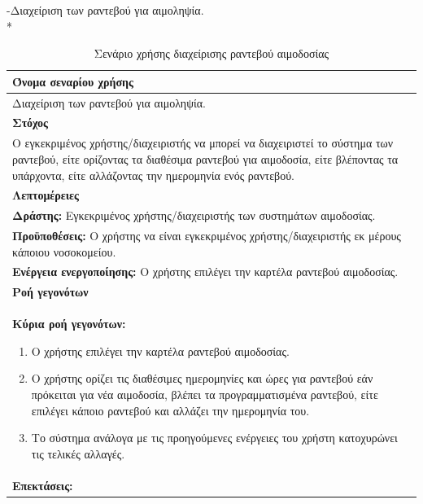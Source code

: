 \newpage
-Διαχείριση των ραντεβού για αιμοληψία.
\\*
\begin{table}[H]
	\begin{center}
	    \begin{tabular}{|p{\dimexpr \linewidth-2\tabcolsep}|}
	    \hline
	    \rowcolor{grayy}
	    \textbf{Όνομα σεναρίου χρήσης}
	    \\ \hline    
	     Διαχείριση των ραντεβού για αιμοληψία.
	     \\ \hline
	    \rowcolor{grayy}
	    \textbf{\textbf{Στόχος}}
	    \\ \hline
	 	 Ο εγκεκριμένος χρήστης/διαχειριστής να μπορεί να διαχειριστεί το σύστημα των ραντεβού, είτε ορίζοντας τα διαθέσιμα ραντεβού για αιμοδοσία, είτε βλέποντας τα υπάρχοντα, είτε αλλάζοντας την ημερομηνία ενός ραντεβού.
	    \\ \hline
	    \rowcolor{grayy}
	    \textbf{Λεπτομέρειες}
	    \\ \hline
		\textbf{Δράστης:} Εγκεκριμένος χρήστης/διαχειριστής των συστημάτων αιμοδοσίας.
		\\*
		\textbf{Προϋποθέσεις:} Ο χρήστης να είναι εγκεκριμένος χρήστης/διαχειριστής εκ μέρους κάποιου νοσοκομείου.
		\\*
		\textbf{Ενέργεια ενεργοποίησης:} Ο χρήστης επιλέγει την καρτέλα ραντεβού αιμοδοσίας.
		\\ \hline
		\rowcolor{grayy}    
	    \textbf{Ροή γεγονότων}
	    \\ \hline
		\textbf{Κύρια ροή γεγονότων:}
		\begin{enumerate}
			\item	 Ο χρήστης επιλέγει την καρτέλα ραντεβού αιμοδοσίας.
			\item  Ο χρήστης ορίζει τις διαθέσιμες ημερομηνίες και ώρες για ραντεβού εάν πρόκειται για νέα  αιμοδοσία, βλέπει τα προγραμματισμένα ραντεβού, είτε επιλέγει κάποιο ραντεβού και αλλάζει την ημερομηνία του. 
			\item Το σύστημα ανάλογα με τις προηγούμενες ενέργειες του χρήστη κατοχυρώνει τις τελικές αλλαγές.
		\end{enumerate}
		\\ \hline
		\rowcolor{grayy}
		\textbf{Επεκτάσεις:}
		   \\ \hline
	    \end{tabular}
	    \caption{Σενάριο χρήσης διαχείρισης ραντεβού αιμοδοσίας}
	    \label{tab:blood_donation_reservation_management_superadmin} 
	\end{center}
\end{table}	


